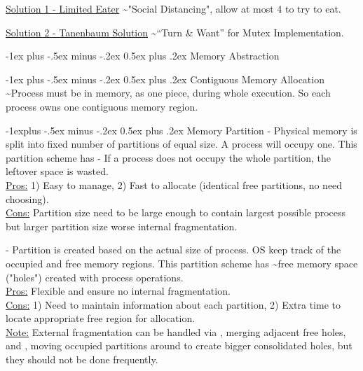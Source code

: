 \documentclass[10pt,landscape,letterpaper]{article}
\makeatletter
\renewcommand{\section}{\@startsection{section}{1}{0mm}%
                                {-1ex plus -.5ex minus -.2ex}%
                                {0.5ex plus .2ex}%
                                {\sffamily\large}}
\renewcommand{\subsection}{\@startsection{subsection}{2}{0mm}%
                                {-1explus -.5ex minus -.2ex}%
                                {0.5ex plus .2ex}%
                                {\sffamily\normalsize\itshape}}
\makeatother
\begin{document}
\begin{multicols}{3}
\underline{Solution 1 - Limited Eater} \textasciitilde "Social Distancing", allow at most 4 to try to eat.

\medskip

\underline{Solution 2 - Tanenbaum Solution} \textasciitilde “Turn \& Want” for Mutex Implementation.

\section{Memory Abstraction}



\section{Contiguous Memory Allocation}
 \textasciitilde Process must be in memory, as one piece, during whole execution. So each process owns one contiguous memory region.

\subsection{Memory Partition}
 - Physical memory is split into fixed number of partitions of equal size. A process will occupy one. This partition scheme has  - If a process does not occupy the whole partition, the leftover space is wasted.
\\
\underline{Pros:} 1) Easy to manage, 2) Fast to allocate (identical free partitions, no need choosing).
\\
\underline{Cons:} Partition size need to be large enough to contain largest possible process but larger partition size worse internal fragmentation.

\medskip

 - Partition is created based on the actual size of process. OS keep track of the occupied and free memory regions. This partition scheme has  \textasciitilde free memory space ("holes") created with process operations.
\\
\underline{Pros:} Flexible and ensure no internal fragmentation.
\\
\underline{Cons:} 1) Need to maintain information about each partition,  2) Extra time to locate appropriate free region for allocation.
\\
\underline{Note:} External fragmentation can be handled via , merging adjacent free holes, and , moving occupied partitions around to create bigger consolidated holes, but they should not be done frequently.


\end{multicols}
\end{document}
